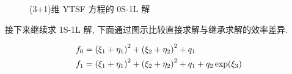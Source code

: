 \begin{frame}
\begin{figure}
\centering
\setcounter{subfigure}{0}
\caption{(3+1)维 YTSF 方程的 0S-1L 解}
\end{figure}
\end{frame}

\begin{frame}
接下来继续求 1S-1L 解, 下面通过图示比较直接求解与继承求解的效率差异. 

\[
\begin{aligned}
    f_0 &= \left(\xi_1+\eta_1\right)^2+\left(\xi_2+\eta_2\right)^2+q_1\\ 
    f_1 &= \left(\xi_1+\eta_1\right)^2+\left(\xi_2+\eta_2\right)^2+q_1+q_2 \exp(\xi_3) 
\end{aligned}
\]
\end{frame}

